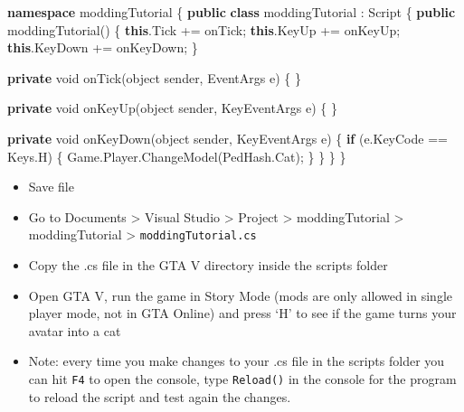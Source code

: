 \documentclass[
  openany]{book}
\newenvironment{Shaded}{\begin{snugshade}}{\end{snugshade}}
\newcommand{\DataTypeTok}[1]{\textcolor[rgb]{0.13,0.29,0.53}{#1}}
\newcommand{\FunctionTok}[1]{\textcolor[rgb]{0.00,0.00,0.00}{#1}}
\newcommand{\KeywordTok}[1]{\textcolor[rgb]{0.13,0.29,0.53}{\textbf{#1}}}
\newcommand{\NormalTok}[1]{#1}
\begin{document}
\begin{Shaded}
\begin{Highlighting}[]
\KeywordTok{namespace}\NormalTok{ moddingTutorial}
\NormalTok{\{}
  \KeywordTok{public} \KeywordTok{class}\NormalTok{ moddingTutorial : Script}
\NormalTok{  \{}
      \KeywordTok{public} \FunctionTok{moddingTutorial}\NormalTok{()}
\NormalTok{      \{}
          \KeywordTok{this}\NormalTok{.}\FunctionTok{Tick}\NormalTok{ += onTick;}
      \KeywordTok{this}\NormalTok{.}\FunctionTok{KeyUp}\NormalTok{ += onKeyUp;}
      \KeywordTok{this}\NormalTok{.}\FunctionTok{KeyDown}\NormalTok{ += onKeyDown;}
\NormalTok{      \}}
    
      \KeywordTok{private} \DataTypeTok{void} \FunctionTok{onTick}\NormalTok{(}\DataTypeTok{object}\NormalTok{ sender, EventArgs e)}
\NormalTok{      \{}
\NormalTok{      \}}
    
      \KeywordTok{private} \DataTypeTok{void} \FunctionTok{onKeyUp}\NormalTok{(}\DataTypeTok{object}\NormalTok{ sender, KeyEventArgs e)}
\NormalTok{      \{}
\NormalTok{      \}}
 
      \KeywordTok{private} \DataTypeTok{void} \FunctionTok{onKeyDown}\NormalTok{(}\DataTypeTok{object}\NormalTok{ sender, KeyEventArgs e)}
\NormalTok{      \{}
        \KeywordTok{if}\NormalTok{ (e.}\FunctionTok{KeyCode}\NormalTok{ == Keys.}\FunctionTok{H}\NormalTok{)}
\NormalTok{        \{}
\NormalTok{              Game.}\FunctionTok{Player}\NormalTok{.}\FunctionTok{ChangeModel}\NormalTok{(PedHash.}\FunctionTok{Cat}\NormalTok{); }
\NormalTok{          \}}
\NormalTok{      \} }
\NormalTok{  \}}
\NormalTok{\}}
\end{Highlighting}
\end{Shaded}

\begin{itemize}
\item
  Save file
\item
  Go to Documents \textgreater{} Visual Studio \textgreater{} Project \textgreater{} moddingTutorial \textgreater{} moddingTutorial \textgreater{} \texttt{moddingTutorial.cs}
\item
  Copy the .cs file in the GTA V directory inside the scripts folder
\item
  Open GTA V, run the game in Story Mode (mods are only allowed in single player mode, not in GTA Online) and press `H' to see if the game turns your avatar into a cat
\item
  Note: every time you make changes to your .cs file in the scripts folder you can hit \texttt{F4} to open the console, type \texttt{Reload()} in the console for the program to reload the script and test again the changes.
\end{itemize}
\end{document}
